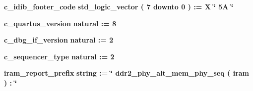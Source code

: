 \begin{DoxyCompactItemize}
\item 
{\bf c\+\_\+idib\+\_\+footer\+\_\+code} {\bfseries \textcolor{comment}{std\+\_\+logic\+\_\+vector}\textcolor{vhdlchar}{ }\textcolor{vhdlchar}{(}\textcolor{vhdlchar}{ }\textcolor{vhdlchar}{ } \textcolor{vhdldigit}{7} \textcolor{vhdlchar}{ }\textcolor{keywordflow}{downto}\textcolor{vhdlchar}{ }\textcolor{vhdlchar}{ } \textcolor{vhdldigit}{0} \textcolor{vhdlchar}{ }\textcolor{vhdlchar}{)}\textcolor{vhdlchar}{ }\textcolor{vhdlchar}{ }\textcolor{vhdlchar}{ }\textcolor{vhdlchar}{\+:}\textcolor{vhdlchar}{=}\textcolor{vhdlchar}{ }\textcolor{vhdlchar}{ }\textcolor{vhdlchar}{X}\textcolor{vhdlchar}{ }\textcolor{keyword}{\char`\"{} 5\+A \char`\"{}}\textcolor{vhdlchar}{ }} 
\item 
{\bf c\+\_\+quartus\+\_\+version} {\bfseries \textcolor{comment}{natural}\textcolor{vhdlchar}{ }\textcolor{vhdlchar}{ }\textcolor{vhdlchar}{\+:}\textcolor{vhdlchar}{=}\textcolor{vhdlchar}{ }\textcolor{vhdlchar}{ } \textcolor{vhdldigit}{8} \textcolor{vhdlchar}{ }} 
\item 
{\bf c\+\_\+dbg\+\_\+if\+\_\+version} {\bfseries \textcolor{comment}{natural}\textcolor{vhdlchar}{ }\textcolor{vhdlchar}{ }\textcolor{vhdlchar}{\+:}\textcolor{vhdlchar}{=}\textcolor{vhdlchar}{ }\textcolor{vhdlchar}{ } \textcolor{vhdldigit}{2} \textcolor{vhdlchar}{ }} 
\item 
{\bf c\+\_\+sequencer\+\_\+type} {\bfseries \textcolor{comment}{natural}\textcolor{vhdlchar}{ }\textcolor{vhdlchar}{ }\textcolor{vhdlchar}{\+:}\textcolor{vhdlchar}{=}\textcolor{vhdlchar}{ }\textcolor{vhdlchar}{ } \textcolor{vhdldigit}{2} \textcolor{vhdlchar}{ }} 
\item 
{\bf iram\+\_\+report\+\_\+prefix} {\bfseries \textcolor{comment}{string}\textcolor{vhdlchar}{ }\textcolor{vhdlchar}{ }\textcolor{vhdlchar}{\+:}\textcolor{vhdlchar}{=}\textcolor{vhdlchar}{ }\textcolor{vhdlchar}{ }\textcolor{vhdlchar}{ }\textcolor{vhdlchar}{ }\textcolor{keyword}{\char`\"{} ddr2\+\_\+phy\+\_\+alt\+\_\+mem\+\_\+phy\+\_\+seq ( iram )  \+:  \char`\"{}}\textcolor{vhdlchar}{ }} 
\end{DoxyCompactItemize}
